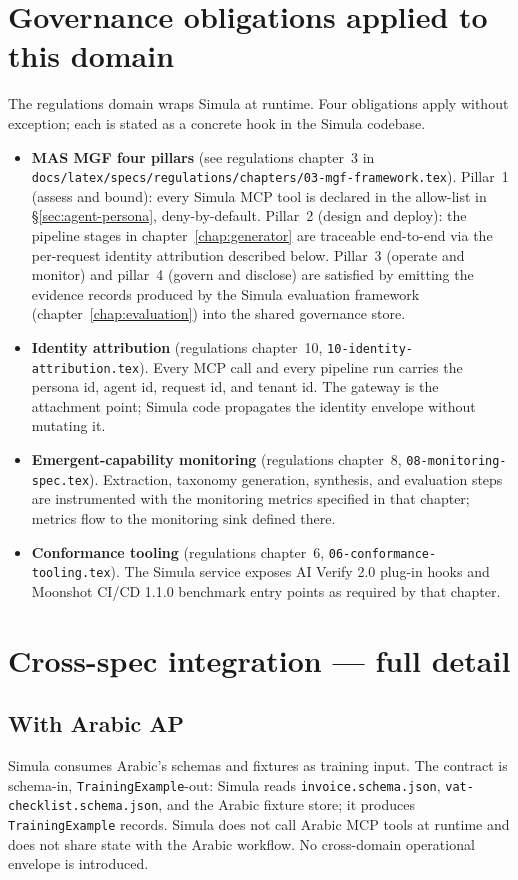 \documentclass[12pt,a4paper,twoside]{report}
\begin{document}
\section{Governance obligations applied to this domain}
\label{sec:agent-governance}
The regulations domain wraps Simula at runtime. Four obligations
apply without exception; each is stated as a concrete hook in the
Simula codebase.

\begin{itemize}
\item \textbf{MAS MGF four pillars} (see regulations
chapter~3 in
\texttt{docs/latex/specs/regulations/chapters/03-mgf-framework.tex}).
Pillar~1 (assess and bound): every Simula MCP tool is declared
in the allow-list in \S\ref{sec:agent-persona}, deny-by-default.
Pillar~2 (design and deploy): the pipeline stages in
chapter~\ref{chap:generator} are traceable end-to-end via the
per-request identity attribution described below. Pillar~3
(operate and monitor) and pillar~4 (govern and disclose) are
satisfied by emitting the evidence records produced by the
Simula evaluation framework (chapter~\ref{chap:evaluation}) into
the shared governance store.
\item \textbf{Identity attribution} (regulations chapter~10,
\texttt{10-identity-attribution.tex}). Every MCP call and every
pipeline run carries the persona id, agent id, request id, and
tenant id. The gateway is the attachment point; Simula code
propagates the identity envelope without mutating it.
\item \textbf{Emergent-capability monitoring} (regulations
chapter~8, \texttt{08-monitoring-spec.tex}). Extraction,
taxonomy generation, synthesis, and evaluation steps are
instrumented with the monitoring metrics specified in that
chapter; metrics flow to the monitoring sink defined there.
\item \textbf{Conformance tooling} (regulations chapter~6,
\texttt{06-conformance-tooling.tex}). The Simula service
exposes AI Verify 2.0 plug-in hooks and Moonshot CI/CD 1.1.0
benchmark entry points as required by that chapter.
\end{itemize}

\section{Cross-spec integration --- full detail}
\label{sec:agent-integration}

\subsection{With Arabic AP}
Simula consumes Arabic's schemas and fixtures as training input. The
contract is schema-in, \texttt{TrainingExample}-out: Simula reads
\texttt{invoice.schema.json}, \texttt{vat-checklist.schema.json}, and
the Arabic fixture store; it produces \texttt{TrainingExample}
records. Simula does not call Arabic MCP tools at runtime and does
not share state with the Arabic workflow. No cross-domain
operational envelope is introduced.
\end{document}
